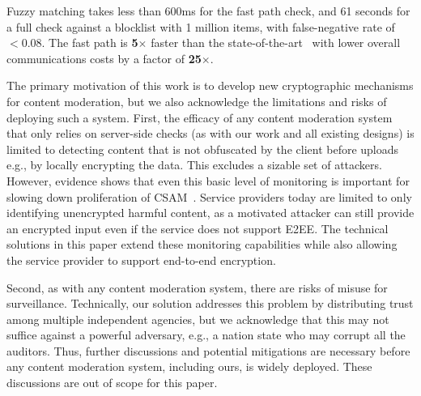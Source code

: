 
Fuzzy matching takes less than 600ms for the fast path check, and 61 seconds for a full check against a blocklist with 1 million items, with false-negative rate of $< 0.08$. The fast path is \textbf{5$\times$} faster than the state-of-the-art~\cite{kulshrestha2021identifying} with lower overall communications costs by a factor of \textbf{25$\times$}.






%
The primary motivation of this work is to develop new cryptographic mechanisms for content moderation, but we also acknowledge the limitations and risks of deploying such a system. First, the efficacy of any content moderation system that only relies on server-side checks (as with our work and all existing designs) is limited to detecting content that is not obfuscated by the client before uploads e.g., by locally encrypting the data. This excludes a sizable set of attackers. However, evidence shows that even this basic level of monitoring is important for slowing down proliferation of CSAM~\cite{}. Service providers today are limited to only identifying unencrypted harmful content, as a motivated attacker can still provide an encrypted input even if the service does not support E2EE. The technical solutions in this paper extend these monitoring capabilities while also allowing the service provider to support end-to-end encryption. 

Second, as with any content moderation system, there are risks of misuse for surveillance. Technically, our solution addresses this problem by distributing trust among multiple independent agencies, but we acknowledge that this may not suffice against a powerful adversary, e.g., a nation state who may corrupt all the auditors. Thus, further discussions and potential mitigations are necessary before any content moderation system, including ours, is widely deployed. These discussions are out of scope for this paper. 
 

